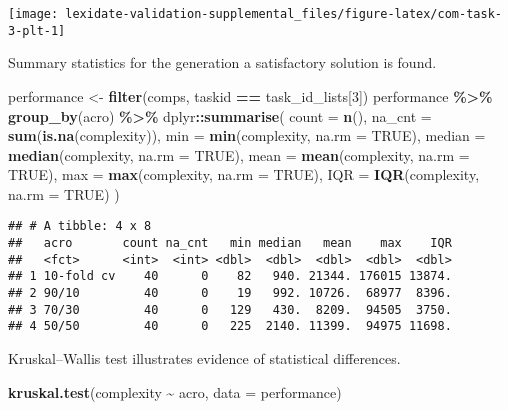 \documentclass[
]{book}
\newenvironment{Shaded}{\begin{snugshade}}{\end{snugshade}}
\newcommand{\AttributeTok}[1]{\textcolor[rgb]{0.13,0.29,0.53}{#1}}
\newcommand{\ConstantTok}[1]{\textcolor[rgb]{0.56,0.35,0.01}{#1}}
\newcommand{\DecValTok}[1]{\textcolor[rgb]{0.00,0.00,0.81}{#1}}
\newcommand{\FunctionTok}[1]{\textcolor[rgb]{0.13,0.29,0.53}{\textbf{#1}}}
\newcommand{\NormalTok}[1]{#1}
\newcommand{\OtherTok}[1]{\textcolor[rgb]{0.56,0.35,0.01}{#1}}
\newcommand{\SpecialCharTok}[1]{\textcolor[rgb]{0.81,0.36,0.00}{\textbf{#1}}}
\begin{document}
\texttt{[image: lexidate-validation-supplemental\_files/figure-latex/com-task-3-plt-1]}

Summary statistics for the generation a satisfactory solution is found.

\begin{Shaded}
\begin{Highlighting}[]
\NormalTok{performance }\OtherTok{\textless{}{-}} \FunctionTok{filter}\NormalTok{(comps, taskid }\SpecialCharTok{==}\NormalTok{ task\_id\_lists[}\DecValTok{3}\NormalTok{])}
\NormalTok{performance }\SpecialCharTok{\%\textgreater{}\%}
  \FunctionTok{group\_by}\NormalTok{(acro) }\SpecialCharTok{\%\textgreater{}\%}
\NormalTok{  dplyr}\SpecialCharTok{::}\FunctionTok{summarise}\NormalTok{(}
    \AttributeTok{count =} \FunctionTok{n}\NormalTok{(),}
    \AttributeTok{na\_cnt =} \FunctionTok{sum}\NormalTok{(}\FunctionTok{is.na}\NormalTok{(complexity)),}
    \AttributeTok{min =} \FunctionTok{min}\NormalTok{(complexity, }\AttributeTok{na.rm =} \ConstantTok{TRUE}\NormalTok{),}
    \AttributeTok{median =} \FunctionTok{median}\NormalTok{(complexity, }\AttributeTok{na.rm =} \ConstantTok{TRUE}\NormalTok{),}
    \AttributeTok{mean =} \FunctionTok{mean}\NormalTok{(complexity, }\AttributeTok{na.rm =} \ConstantTok{TRUE}\NormalTok{),}
    \AttributeTok{max =} \FunctionTok{max}\NormalTok{(complexity, }\AttributeTok{na.rm =} \ConstantTok{TRUE}\NormalTok{),}
    \AttributeTok{IQR =} \FunctionTok{IQR}\NormalTok{(complexity, }\AttributeTok{na.rm =} \ConstantTok{TRUE}\NormalTok{)}
\NormalTok{  )}
\end{Highlighting}
\end{Shaded}

\begin{verbatim}
## # A tibble: 4 x 8
##   acro       count na_cnt   min median   mean    max    IQR
##   <fct>      <int>  <int> <dbl>  <dbl>  <dbl>  <dbl>  <dbl>
## 1 10-fold cv    40      0    82   940. 21344. 176015 13874.
## 2 90/10         40      0    19   992. 10726.  68977  8396.
## 3 70/30         40      0   129   430.  8209.  94505  3750.
## 4 50/50         40      0   225  2140. 11399.  94975 11698.
\end{verbatim}

Kruskal--Wallis test illustrates evidence of statistical differences.

\begin{Shaded}
\begin{Highlighting}[]
\FunctionTok{kruskal.test}\NormalTok{(complexity }\SpecialCharTok{\textasciitilde{}}\NormalTok{ acro, }\AttributeTok{data =}\NormalTok{ performance)}
\end{Highlighting}
\end{Shaded}
\end{document}
